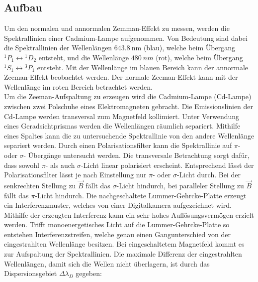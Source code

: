\subsection{Aufbau}
Um den normalen und annormalen Zemman-Effekt zu messen, werden die Spektrallinien einer Cadmium-Lampe aufgenommen.
Von Bedeutung sind dabei die Spektrallinien der Wellenlängen $\SI{643.8}{\nano\meter}$ (blau), welche beim Übergang ${}^1P_1\leftrightarrow{}^1D_2$ entsteht, und
die Wellenlänge $\SI{480}{nm}$ (rot), welche beim Übergang ${}^1S_1\leftrightarrow{}^3P_1$ entsteht.
Mit der Wellenlänge im blauen Bereich kann der annormale Zeeman-Effekt beobachtet werden.
Der normale Zeeman-Effekt kann mit der Wellenlänge im roten Bereich betrachtet werden.\\
%
Um die Zeeman-Aufspaltung zu erzeugen wird die Cadmium-Lampe (Cd-Lampe) zwischen zwei Polschuhe eines Elektromagneten gebracht.
Die Emissionslinien der Cd-Lampe werden transversal zum Magnetfeld kollimiert.
Unter Verwendung eines Geradsichtprismas werden die Wellenlängen räumlich separiert.
Mithilfe eines Spaltes kann die zu untersuchende Spektrallinie von den andere Wellenlänge separiert werden.
Durch einen Polarisationsfilter kann die Spektrallinie auf $\pi$- oder $\sigma$- Übergänge untersucht werden.
Die transversale Betrachtung sorgt dafür, dass sowohl $\pi$- als auch $\sigma$-Licht linear polarisiert erscheint.
Entsprechend lässt der Polarisationsfilter lässt je nach Einstellung nur $\pi$- oder $\sigma$-Licht durch.
Bei der senkrechten Stellung zu $\vec{B}$ fällt das $\sigma$-Licht hindurch, bei paralleler Stellung zu $\vec{B}$ fällt das $\pi$-Licht hindurch.
Die nachgeschaltete Lummer-Gehrcke-Platte erzeugt ein Interferenzmuster, welches von einer Digitalkamera aufgezeichnet wird.
Mithilfe der erzeugten Interferenz kann ein sehr hohes Auflösungsvermögen erzielt werden.
Trifft monoenergetisches Licht auf die Lummer-Gehrcke-Platte so entstehen Interferenzstreifen, welche genau einen Gangunterschied von der eingestrahlten Wellenlänge besitzen.
Bei eingeschaltetem Magnetfeld kommt es zur Aufspaltung der Spektrallinien.
Die maximale Differenz der eingestrahlten Wellenlängen, damit sich die Wellen nicht überlagern, ist durch das Dispersionsgebiet $\Delta \lambda_D$ gegeben:
